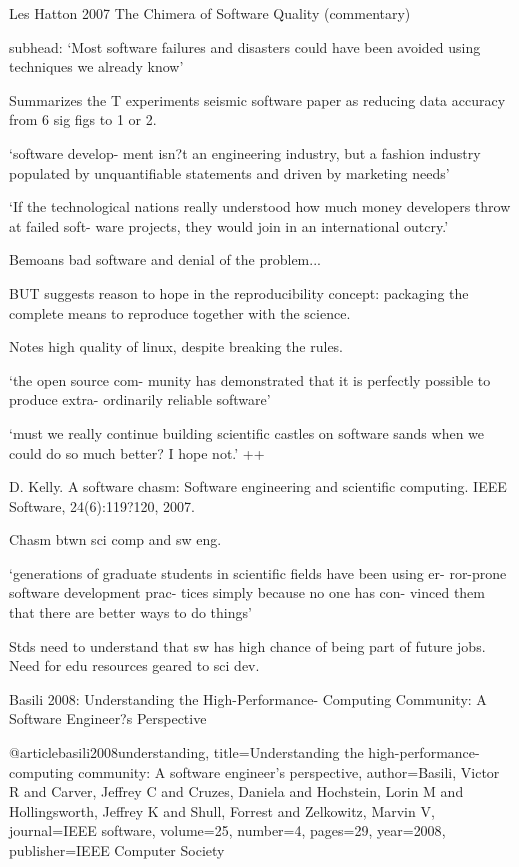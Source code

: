 \documentclass[12pt]{amsart}
\begin{document}
Les Hatton 2007 The Chimera of Software Quality (commentary)

subhead: `Most software failures
and disasters could have
been avoided using techniques we already know'

Summarizes the T experiments seismic software paper as reducing data accuracy from 6 sig figs to 1 or 2.

`software develop- ment isn?t an engineering industry, but a fashion industry populated by unquantifiable statements and driven by marketing needs'

`If the technological nations really understood how much money developers throw at failed soft- ware projects, they would join in an international outcry.'

Bemoans bad software and denial of the problem...

BUT suggests reason to hope in the reproducibility concept: packaging the complete means to reproduce together with the science.

Notes high quality of linux, despite breaking the rules.

`the open source com- munity has demonstrated that it is perfectly possible to produce extra- ordinarily reliable software'

`must we really continue building scientific castles on software sands when we could do so much better? I hope not.' ++



D. Kelly. A software chasm: Software engineering and scientific computing. IEEE Software, 24(6):119?120, 2007.

Chasm btwn sci comp and sw eng. 

`generations of graduate students in scientific fields have been using er- ror-prone software development prac- tices simply because no one has con- vinced them that there are better ways to do things'

Stds need to understand that sw has high chance of being part of future jobs. Need for edu resources geared to sci dev.



Basili 2008: Understanding
the High-Performance-
Computing Community:
A Software Engineer?s Perspective

@article{basili2008understanding,
  title={Understanding the high-performance-computing community: A software engineer's perspective},
  author={Basili, Victor R and Carver, Jeffrey C and Cruzes, Daniela and Hochstein, Lorin M and Hollingsworth, Jeffrey K and Shull, Forrest and Zelkowitz, Marvin V},
  journal={IEEE software},
  volume={25},
  number={4},
  pages={29},
  year={2008},
  publisher={IEEE Computer Society}
}
\end{document}
